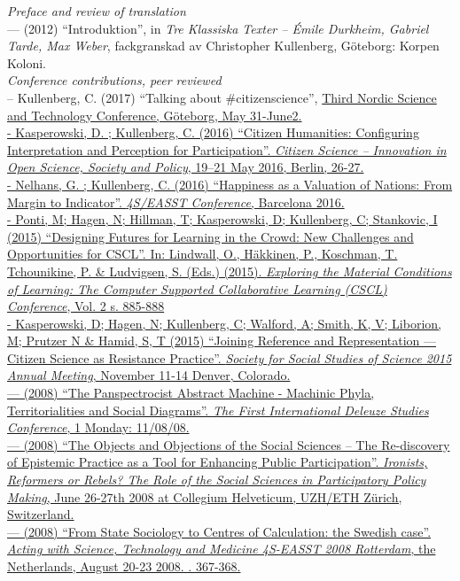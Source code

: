 \documentclass[a4paper,11pt,oneside]{article}
\begin{document}
  \noindent \emph{Preface and review of translation}\\
    --- (2012) ``Introduktion'', in \emph{Tre Klassiska Texter – Émile Durkheim, Gabriel Tarde, Max Weber}, fackgranskad av Christopher Kullenberg, Göteborg: Korpen Koloni.\\

  \noindent \emph{Conference contributions, peer reviewed}\\
  – Kullenberg, C. (2017) ``Talking about #citizenscience'', \href{http://socav.gu.se/english/research/third-nordic-science-and-technology-studies-conference}{Third Nordic Science and Technology Conference, Göteborg, May 31-June2.\\
  - Kasperowski, D. ; Kullenberg, C. (2016) ``Citizen Humanities: Configuring Interpretation and Perception for Participation''. \emph{Citizen Science – Innovation in Open Science, Society and Policy}, 19–21 May 2016, Berlin, 26-27.\\
  - Nelhans, G. ; Kullenberg, C. (2016) ``Happiness as a Valuation of Nations: From Margin to Indicator''. \emph{4S/EASST Conference}, Barcelona 2016.\\
  - Ponti, M; Hagen, N; Hillman, T; Kasperowski, D; Kullenberg, C; Stankovic, I (2015) ``Designing Futures for Learning in the Crowd: New Challenges and Opportunities for CSCL''. In: Lindwall, O., Häkkinen, P., Koschman, T. Tchounikine, P. & Ludvigsen, S. (Eds.) (2015). \emph{Exploring the Material Conditions of Learning: The Computer Supported Collaborative Learning (CSCL) Conference}, Vol. 2 s. 885-888\\
  - Kasperowski, D; Hagen, N; Kullenberg, C; Walford, A; Smith, K, V; Liborion, M; Prutzer N & Hamid, S, T (2015) ``Joining Reference and Representation — Citizen Science as Resistance Practice''. \emph{Society for Social Studies of Science 2015 Annual Meeting}, November 11-14 Denver, Colorado.\\
  --- (2008) ``The Panspectrocist Abstract Machine - Machinic Phyla, Territorialities and Social Diagrams''. \emph{The First International Deleuze Studies Conference}, 1 Monday: 11/08/08.\\
  --- (2008) ``The Objects and Objections of the Social Sciences – The Re-discovery of Epistemic Practice as a Tool for Enhancing Public Participation''. \emph{Ironists, Reformers or Rebels? The Role of the Social Sciences in Participatory Policy Making}, June 26-27th 2008 at Collegium Helveticum, UZH/ETH Zürich, Switzerland.\\
  --- (2008) ``From State Sociology to Centres of Calculation: the Swedish case''. \emph{Acting with Science, Technology and Medicine 4S-EASST 2008 Rotterdam}, the Netherlands, August 20-23 2008. . 367-368.\\

}
\end{document}
